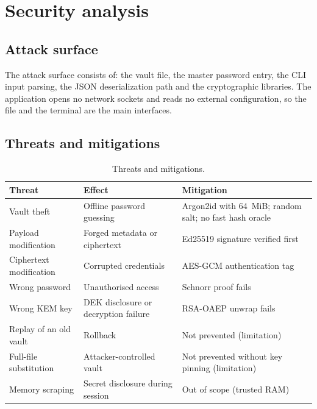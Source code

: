 \documentclass[11pt,a4paper]{article}
\begin{document}
\section{Security analysis}\label{sec:analysis}

\subsection{Attack surface}

The attack surface consists of: the vault file, the master password entry, the
CLI input parsing, the JSON deserialization path and the cryptographic
libraries. The application opens no network sockets and reads no external
configuration, so the file and the terminal are the main interfaces.

\subsection{Threats and mitigations}

\begin{table}[htbp]
\centering
\small
\begin{tabular}{@{}p{3.8cm}p{5.2cm}p{5.2cm}@{}}
\toprule
\textbf{Threat} & \textbf{Effect} & \textbf{Mitigation} \\
\midrule
Vault theft & Offline password guessing & Argon2id with 64~MiB; random salt; no fast hash oracle \\
Payload modification & Forged metadata or ciphertext & Ed25519 signature verified first \\
Ciphertext modification & Corrupted credentials & AES-GCM authentication tag \\
Wrong password & Unauthorised access & Schnorr proof fails \\
Wrong KEM key & DEK disclosure or decryption failure & RSA-OAEP unwrap fails \\
Replay of an old vault & Rollback & Not prevented (limitation) \\
Full-file substitution & Attacker-controlled vault & Not prevented without key pinning (limitation) \\
Memory scraping & Secret disclosure during session & Out of scope (trusted RAM) \\
\bottomrule
\end{tabular}
\caption{Threats and mitigations.}
\label{tab:threats}
\end{table}
\end{document}
